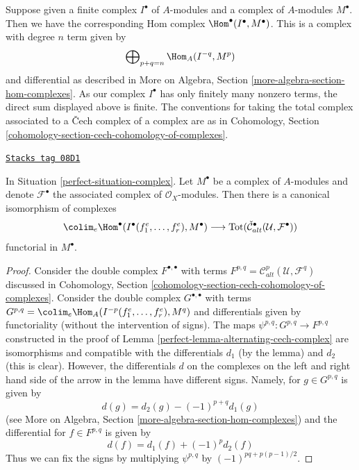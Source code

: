 Suppose given a finite complex $I^\bullet$ of $A$-modules and a
complex of $A$-modules $M^\bullet$. Then we have the corresponding
Hom complex $\Hom^\bullet(I^\bullet, M^\bullet)$. This is a complex
with degree $n$ term given by
$$
\bigoplus\nolimits_{p + q = n} \Hom_A(I^{-q}, M^p)
$$
and differential as described in More on Algebra, Section
\ref{more-algebra-section-hom-complexes}.
As our complex $I^\bullet$ has only finitely many nonzero terms, the
direct sum displayed above is finite.
The conventions for taking the total complex associated to a
{\v C}ech complex of a complex are as in
Cohomology, Section \ref{cohomology-section-cech-cohomology-of-complexes}.

\begin{lemma}
\label{perfect-lemma-alternating-cech-complex-complex}
\href{https://stacks.math.columbia.edu/tag/08D1}{\texttt{Stacks tag 08D1}}

In Situation \ref{perfect-situation-complex}. Let $M^\bullet$ be a
complex of $A$-modules and
denote $\mathcal{F}^\bullet$ the associated complex of
$\mathcal{O}_X$-modules. Then
there is a canonical isomorphism of complexes
$$
\colim_e \Hom^\bullet(I^\bullet(f_1^e, \ldots, f_r^e), M^\bullet)
\longrightarrow
\text{Tot}(\check{\mathcal{C}}_{alt}^\bullet(\mathcal{U}, \mathcal{F}^\bullet))
$$
functorial in $M^\bullet$.
\end{lemma}

\begin{proof}

Consider the double complex $F^{\bullet, \bullet}$ with terms
$F^{p, q} = \mathcal{C}_{alt}^p(\mathcal{U}, \mathcal{F}^q)$
discussed in
Cohomology, Section \ref{cohomology-section-cech-cohomology-of-complexes}.
Consider the double complex $G^{\bullet, \bullet}$ with terms
$G^{p, q} = \colim_e \Hom_A(I^{-p}(f_1^e, \ldots, f_r^e), M^q)$ and
differentials given by functoriality (without the intervention
of signs). The maps $\psi^{p, q} : G^{p, q} \to F^{p, q}$
constructed in the proof of Lemma \ref{perfect-lemma-alternating-cech-complex}
are isomorphisms and compatible with the differentials $d_1$ (by the lemma)
and $d_2$ (this is clear). However, the differentials $d$ on the
complexes on the left and right hand side of the arrow in the lemma
have different signs. Namely, for $g \in G^{p, q}$ is given by
$$
d(g) =  d_2(g) - (-1)^{p + q} d_1(g)
$$
(see More on Algebra, Section \ref{more-algebra-section-hom-complexes})
and the differential for $f \in F^{p, q}$ is given by
$$
d(f) = d_1(f) + (-1)^p d_2(f)
$$
Thus we can fix the signs by multiplying $\psi^{p, q}$ by
$(-1)^{pq + p(p - 1)/2}$.
\end{proof}

